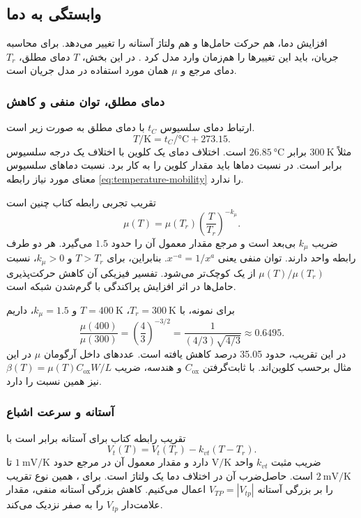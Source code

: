 \clearpage
\subsection{وابستگی به دما}
\label{sec:temperature-dependence}
افزایش دما، هم حرکت حامل‌ها و هم ولتاژ آستانه را تغییر می‌دهد. برای
محاسبه جریان، باید این تغییرها را هم‌زمان وارد مدل کرد
\cite[بخش ، صفحات ۸۵ و ۸۶]{weste}
\cite[اسلاید ۲۹]{nonideal}. در این بخش، \(T\) دمای مطلق، \(T_r\)
دمای مرجع و \(\mu\) همان  مورد استفاده در مدل جریان است.

\subsubsection*{دمای مطلق، توان منفی و کاهش }
ارتباط دمای سلسیوس \(t_C\) با دمای مطلق به صورت زیر است.
\[
 T/\unit{\kelvin}=t_C/\unit{\degreeCelsius}+273.15.
\]
مثلاً \(\qty{300}{\kelvin}\) برابر \(\qty{26.85}{\degreeCelsius}\)
است. اختلاف دمای یک کلوین با اختلاف یک درجه سلسیوس برابر است.
در نسبت دماها باید مقدار کلوین را به کار برد. نسبت دماهای سلسیوس
معنای مورد نیاز رابطه \eqref{eq:temperature-mobility} را ندارد.

تقریب تجربی رابطه  کتاب چنین است
\begin{equation}
 \boxed{\mu(T)=\mu(T_r)\left(\frac{T}{T_r}\right)^{-k_\mu}}.
 \label{eq:temperature-mobility}
\end{equation}
ضریب \(k_\mu\) بی‌بعد است و مرجع مقدار معمول آن را حدود \(1.5\)
می‌گیرد. هر دو طرف رابطه واحد  دارند. توان منفی یعنی
\(x^{-a}=1/x^a\). بنابراین، برای \(T>T_r\) و \(k_\mu>0\)، نسبت
\(\mu(T)/\mu(T_r)\) از یک کوچک‌تر می‌شود. تفسیر فیزیکی آن کاهش
حرکت‌پذیری حامل‌ها در اثر افزایش پراکندگی با گرم‌شدن شبکه است.

برای نمونه، با \(T_r=\qty{300}{\kelvin}\)،
\(T=\qty{400}{\kelvin}\) و \(k_\mu=1.5\)، داریم
\begin{equation*}
 \frac{\mu(400)}{\mu(300)}
 =\left(\frac{4}{3}\right)^{-3/2}
 =\frac{1}{(4/3)\sqrt{4/3}}\approx0.6495.
\end{equation*}
در این تقریب،  حدود \num{35.05} درصد کاهش یافته است.
عددهای داخل آرگومان \(\mu\) در این مثال برحسب کلوین‌اند.
با ثابت‌گرفتن \(C_{\mathrm{ox}}\) و هندسه، ضریب
\(\beta(T)=\mu(T)C_{\mathrm{ox}}W/L\) نیز همین نسبت را دارد.

\subsubsection*{آستانه و سرعت اشباع}
تقریب رابطه  کتاب برای آستانه  برابر است با
\begin{equation}
 \boxed{V_t(T)=V_t(T_r)-k_{vt}(T-T_r)}.
 \label{eq:temperature-threshold}
\end{equation}
ضریب مثبت \(k_{vt}\) واحد \(\unit{\volt\per\kelvin}\) دارد و مقدار
معمول آن در مرجع حدود \(\qty{1}{\milli\volt\per\kelvin}\) تا
\(\qty{2}{\milli\volt\per\kelvin}\) است. حاصل‌ضرب آن در اختلاف
دما یک ولتاژ است. برای ، همین نوع تقریب را بر بزرگی آستانه
\(V_{TP}=|V_{tp}|\) اعمال می‌کنیم. کاهش بزرگی آستانه منفی، مقدار
علامت‌دار \(V_{tp}\) را به صفر نزدیک می‌کند.

